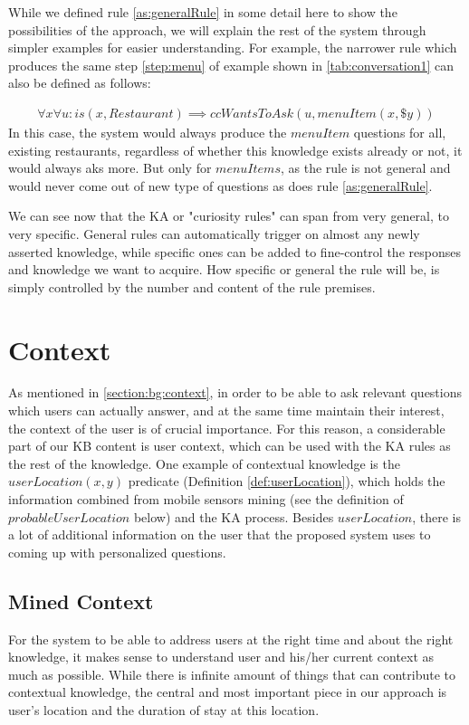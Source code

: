While we defined rule \ref{as:generalRule} in some detail here to show the 
possibilities of the approach, we will explain the rest of the system through 
simpler examples for easier understanding. For example, the narrower rule which
produces the same step \ref{step:menu} of example shown in 
\autoref{tab:conversation1} can also be defined as follows:

\begin{equation}\label{as:specificRule}
\begin{gathered}
\forall x \forall u:is(x,Restaurant) \implies ccWantsToAsk(u,menuItem(x,\$y))
\end{gathered}
\end{equation}
In this case, the system would always produce the $menuItem$ questions for all, 
existing restaurants, regardless of whether this knowledge exists already or
not, it would always aks more. But only for $menuItems$, as the rule is not
general and would never come out of new type of questions as does rule 
\ref{as:generalRule}.

We can see now that the KA or "curiosity rules" can span from very general, to 
very specific. General rules can automatically trigger on almost any newly 
asserted knowledge, while specific ones can be added to fine-control the 
responses and knowledge we want to acquire. How specific or general the rule 
will be, is simply controlled by the number and content of the rule premises.

\section{Context}
\label{section:context}

As mentioned in \autoref{section:bg:context}, in order to be able to ask 
relevant questions which users can actually answer, and at the same time 
maintain their interest, the context of the user is of crucial importance. For 
this reason, a considerable part of our KB content is user context, which can 
be used with the KA rules as the rest of the knowledge. One example of 
contextual knowledge is the $userLocation(x,y)$ predicate 
(Definition \ref{def:userLocation}), which holds the information combined from 
mobile 
sensors mining (see the definition of $probableUserLocation$ below) and the KA 
process. Besides $userLocation$, there is a lot of additional information on the
user that the proposed system uses to coming up with personalized questions.

\subsection{Mined Context}
\label{section:minedContext}
For the system to be able to address users at the right time and about the right
knowledge, it makes sense to understand user and his/her current context as
much as possible. While there is infinite amount of things that can contribute
to contextual knowledge, the central and most important piece in our 
approach is user's location and the duration of stay at this location. 

